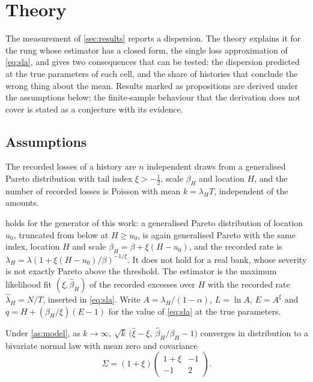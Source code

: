 \section{Theory}
\label{sec:theory}

The measurement of \cref{sec:results} reports a dispersion. The theory explains it for the rung whose estimator has a closed form, the single loss approximation of \cref{eq:sla}, and gives two consequences that can be tested: the dispersion predicted at the true parameters of each cell, and the share of histories that conclude the wrong thing about the mean.
Results marked as propositions are derived under the assumptions below; the finite-sample behaviour that the derivation does not cover is stated as a conjecture with its evidence.

\subsection{Assumptions}
\label{sec:theory-assumptions}

\begin{assumption}
\label{as:model}
The recorded losses of a history are $n$ independent draws from a generalised Pareto distribution with tail index $\xi>-\tfrac12$, scale $\beta_H$ and location $H$, and the number of recorded losses is Poisson with mean $k=\lambda_H T$, independent of the amounts.
\end{assumption}

 holds for the generator of this work: a generalised Pareto distribution of location $u_0$, truncated from below at $H\ge u_0$, is again generalised Pareto with the same index, location $H$ and scale $\beta_H=\beta+\xi(H-u_0)$, and the recorded rate is $\lambda_H=\lambda(1+\xi(H-u_0)/\beta)^{-1/\xi}$. It does not hold for a real bank, whose severity is not exactly Pareto above the threshold.
The estimator is the maximum likelihood fit $(\hat\xi,\hat\beta_H)$ of the recorded excesses over $H$ with the recorded rate $\hat\lambda_H=N/T$, inserted in \cref{eq:sla}. Write $A=\lambda_H/(1-\alpha)$, $L=\ln A$, $E=A^{\xi}$ and $q=H+(\beta_H/\xi)(E-1)$ for the value of \cref{eq:sla} at the true parameters.

\begin{lemma}
\label{lem:mle}
Under \cref{as:model}, as $k\to\infty$, $\sqrt k\,\bigl(\hat\xi-\xi,\ \hat\beta_H/\beta_H-1\bigr)$ converges in distribution to a bivariate normal law with mean zero and covariance
\begin{equation}
\Sigma=(1+\xi)\begin{pmatrix}1+\xi&-1\\-1&2\end{pmatrix}.
\label{eq:mle-cov}
\end{equation}
\end{lemma}

